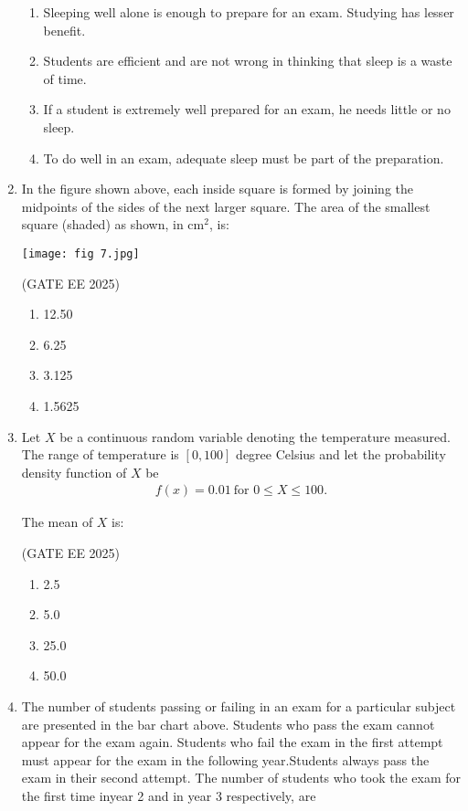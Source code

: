 \documentclass[journal,12pt,onecolumn]{IEEEtran}
\theoremstyle{remark}
\begin{document}
\begin{enumerate}
\begin{enumerate}
\item Sleeping well alone is enough to prepare for an exam. Studying has lesser benefit.
\item Students are efficient and are not wrong in thinking that sleep is a waste of time.
\item If a student is extremely well prepared for an exam, he needs little or no sleep.
\item To do well in an exam, adequate sleep must be part of the preparation.
\end{enumerate}

\item In the figure shown above, each inside square is formed by joining the midpoints of the sides of the next larger square. The area of the smallest square (shaded) as shown, in cm$^2$, is:  

    \texttt{[image: fig 7.jpg]}

\hfill(GATE EE 2025)

\begin{multicols}{4}
\begin{enumerate}
\item 12.50
\item 6.25
\item 3.125
\item 1.5625
\end{enumerate}
\end{multicols}

\item Let $X$ be a continuous random variable denoting the temperature measured. 
The range of temperature is $[0,100]$ degree Celsius and let the probability density function of $X$ be \begin{align*}
 f(x) = 0.01 \ \text{for } 0 \leq X \leq 100.     
\end{align*} 

The mean of $X$ is:

\hfill(GATE EE 2025)

\begin{multicols}{4}
\begin{enumerate}
\item 2.5
\item 5.0
\item 25.0
\item 50.0
\end{enumerate}
\end{multicols}

\item The number of students passing or failing in an exam for a particular subject are presented in the bar chart above. 
Students who pass the exam cannot appear for the exam again. Students who fail the exam in the first attempt must appear for the exam in the following year.Students always pass the exam in their second attempt. The number of students who took the exam for the first time inyear 2 and in year 3 respectively, are \underline{\hspace{2cm}}


\end{enumerate}
\end{document}
